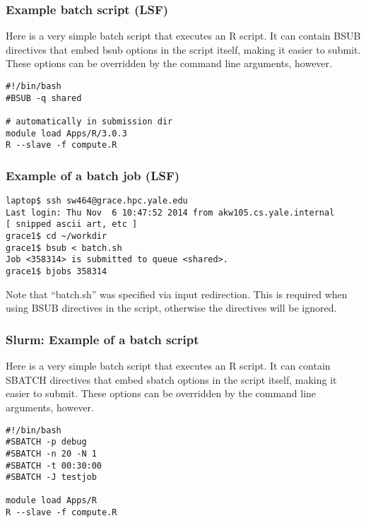 \documentclass[10pt]{beamer}
\begin{document}
\begin{frame}[fragile]
\frametitle{Example batch script (LSF)}
Here is a very simple batch script that executes an R script.
It can contain BSUB directives that embed bsub options
in the script itself, making it easier to submit.  These options
can be overridden by the command line arguments, however.

\begin{block}{}
\begin{verbatim}
#!/bin/bash
#BSUB -q shared

# automatically in submission dir
module load Apps/R/3.0.3
R --slave -f compute.R
\end{verbatim}
\end{block}
\end{frame}

\begin{frame}[fragile]
\frametitle{Example of a batch job (LSF)}
\begin{verbatim}
laptop$ ssh sw464@grace.hpc.yale.edu
Last login: Thu Nov  6 10:47:52 2014 from akw105.cs.yale.internal
[ snipped ascii art, etc ]
grace1$ cd ~/workdir
grace1$ bsub < batch.sh
Job <358314> is submitted to queue <shared>.
grace1$ bjobs 358314
\end{verbatim}

\vskip14pt
Note that ``batch.sh'' was specified via input redirection.
This is required when using BSUB directives in the script,
otherwise the directives will be ignored.
\end{frame}

\begin{frame}[fragile]
\frametitle{Slurm: Example of a batch script}
Here is a very simple batch script that executes an R script.
It can contain SBATCH directives that embed sbatch options
in the script itself, making it easier to submit.  These options
can be overridden by the command line arguments, however.
\begin{block}{}
\begin{verbatim}
#!/bin/bash
#SBATCH -p debug 
#SBATCH -n 20 -N 1
#SBATCH -t 00:30:00  
#SBATCH -J testjob

module load Apps/R
R --slave -f compute.R
\end{verbatim}
\end{block}{}
\end{frame}
\end{document}

